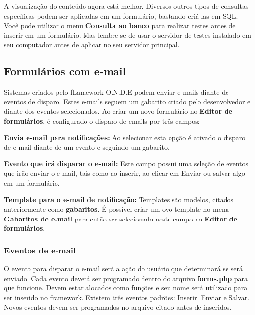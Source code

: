 \documentclass[9pt]{report}
\begin{document}
{      A visualização do conteúdo agora está melhor. Diversos outros
      tipos de consultas específicas podem ser aplicadas em um
      formulário, bastando criá-las em SQL. Você pode utilizar o menu
      \textbf{Consulta ao banco} para realizar testes antes de
      inserir em um formulário. Mas lembre-se de usar o servidor de
      testes instalado em seu computador antes de aplicar no seu
      servidor principal.
        
      \subsection{Formulários com e-mail} 

      Sistemas criados pelo fLamework O.N.D.E podem enviar e-mails
      diante de eventos de disparo. Estes e-mails seguem um gabarito
      criado pelo desenvolvedor e diante dos eventos selecionados.
      Ao criar um novo formulário no \textbf{Editor de formulários},
      é configurado o disparo de emails por três campos:

      \underline{\textbf{Envia e-mail para notificações:}} Ao
      selecionar esta opção é ativado o disparo de e-mail diante de
      um evento e seguindo um gabarito.
      
      \underline{\textbf{Evento que irá disparar o e-mail:}} Este
      campo possui uma seleção de eventos que irão enviar o e-mail,
      tais como ao inserir, ao clicar em Enviar ou salvar algo em um
      formulário.
      
      \underline{\textbf{Template para o e-mail de notificação:}}
      Templates são modelos, citados anteriormente como
      \textbf{gabaritos}. É possível criar um ovo template no menu
      \textbf{Gabaritos de e-mail} para então ser selecionado neste
      campo no \textbf{Editor de formulários}.
      
      \subsubsection{Eventos de e-mail}

      O evento para disparar o e-mail será a ação do usuário que
      determinará se será enviado. Cada evento deverá ser programado
      dentro do arquivo \textbf{forms.php} para que funcione. Devem
      estar alocados como funções e seu nome será utilizado para ser
      inserido no framework. Existem três eventos padrões: Inserir,
      Enviar e Salvar. Novos eventos devem ser programados no arquivo
      citado antes de inseridos.

}
\end{document}
